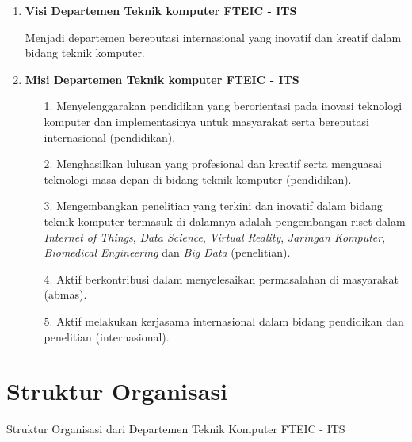 \begin{enumerate}[nolistsep]

  \item \textbf{Visi Departemen Teknik komputer FTEIC - ITS}

	Menjadi departemen bereputasi internasional yang inovatif dan kreatif dalam bidang teknik komputer.

  \item \textbf{Misi Departemen Teknik komputer FTEIC - ITS}

  \begin{enumerate}[nolistsep]

    \item [1. ] Menyelenggarakan pendidikan yang berorientasi pada inovasi teknologi komputer dan implementasinya untuk masyarakat serta bereputasi internasional (pendidikan).

    \item [2. ] Menghasilkan lulusan yang profesional dan kreatif serta menguasai teknologi masa depan di bidang teknik komputer (pendidikan).

    \item [3. ] Mengembangkan penelitian yang terkini dan inovatif dalam bidang teknik komputer termasuk di dalamnya adalah pengembangan riset dalam \textit{Internet of Things}, \textit{Data Science}, \textit{Virtual Reality}, \textit{Jaringan Komputer}, \textit{Biomedical Engineering} dan \textit{Big Data} (penelitian).

    \item [4. ] Aktif berkontribusi dalam menyelesaikan permasalahan di masyarakat (abmas).

    \item [5. ] Aktif melakukan kerjasama internasional dalam bidang pendidikan dan penelitian (internasional).
  \end{enumerate}

\end{enumerate}

\section{Struktur Organisasi}

Struktur Organisasi dari Departemen Teknik Komputer FTEIC - ITS

